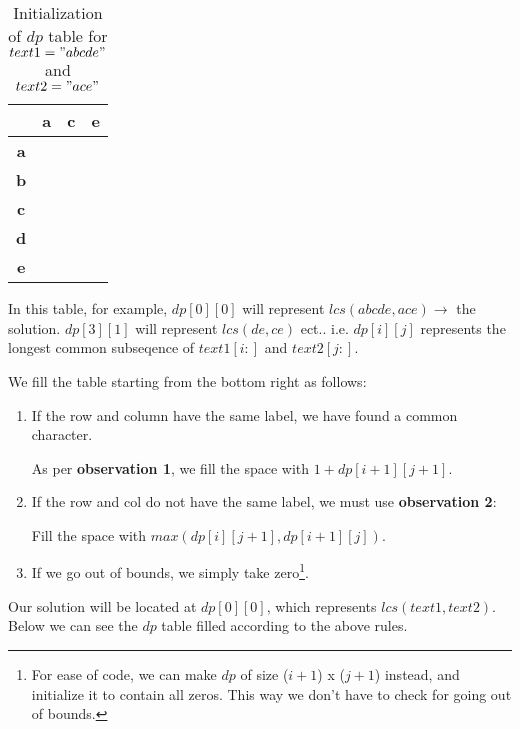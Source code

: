 \begin{table}[htbp]
    \centering
    \begin{tabular}{|c|c|c|c|}
        \hline
          & \textbf{a} & \textbf{c} & \textbf{e} \\
        \hline
        \textbf{a} &   &   &   \\
        \hline
        \textbf{b} &   &   &    \\
        \hline
        \textbf{c} &   &   &    \\
        \hline
        \textbf{d} &   &   &   \\
        \hline
        \textbf{e} &   &   &    \\
        \hline
    \end{tabular}
    \caption{Initialization of $dp$ table for $text1="abcde"$ and $text2="ace"$}
\end{table}

In this table, for example,
$dp[0][0]$ will represent $lcs(abcde,ace) \rightarrow$  the solution.
$dp[3][1]$ will represent $lcs(de,ce)$ ect..
i.e. $dp[i][j]$ represents the longest common subseqence of $text1[i:]$ and $text2[j:]$.

We fill the table starting from the bottom right as follows:

\begin{enumerate}
    \item If the row and column have the same label, we have found a common character.

    As per \textbf{observation 1}, we fill the space with $1 + dp[i+1][j+1]$.
    
    \item If the row and col do not have the same label, we must use \textbf{observation 2}:

    Fill the space with $max(dp[i][j+1], dp[i+1][j])$.
    
    \item If we go out of bounds, we simply take zero\footnote{For ease of code, we can make $dp$ of size ($i+1$) x ($j+1$) instead, and initialize it to contain all zeros. This way we don't have to check for going out of bounds.}.
\end{enumerate}

Our solution will be located at $dp[0][0]$, which represents $lcs(text1,text2)$. Below we can see the $dp$ table filled according to the above rules.

